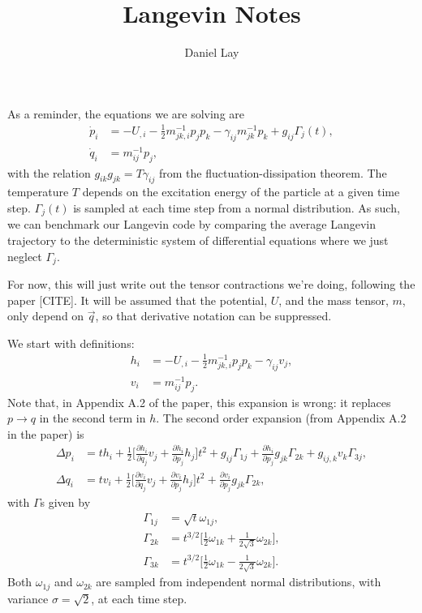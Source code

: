\documentclass[aps,mph,amsmath,amssymb,author-year]{revtex4-1}
\newcommand{\pd}{\partial}
\begin{document}
\title{Langevin Notes}
\author{Daniel Lay}

\maketitle

As a reminder, the equations we are solving are
\begin{align}
	\dot{p}_i&=-U_{,i}-\frac{1}{2}m^{-1}_{jk,i}p_jp_k-\gamma_{ij}m^{-1}_{jk}p_k+g_{ij}\Gamma_j(t),\\
	\dot{q}_i&=m^{-1}_{ij}p_j,
\end{align}
with the relation $g_{ik}g_{jk}=T\gamma_{ij}$ from the fluctuation-dissipation theorem. The temperature $T$ depends on the excitation energy of the particle at a given time step. $\Gamma_j(t)$ is sampled at each time step from a normal distribution. As such, we can benchmark our Langevin code by comparing the average Langevin trajectory to the deterministic system of differential equations where we just neglect $\Gamma_j$.

For now, this will just write out the tensor contractions we're doing, following the paper [CITE]. It will be assumed that the potential, $U$, and the mass tensor, $m$, only depend on $\vec{q}$, so that derivative notation can be suppressed.

We start with definitions:
\begin{align}
	h_i&=-U_{,i}-\frac{1}{2}m^{-1}_{jk,i}p_jp_k-\gamma_{ij}v_j,\\
	v_i&=m^{-1}_{ij}p_j.
\end{align}
Note that, in Appendix A.2 of the paper, this expansion is wrong: it replaces $p\to q$ in the second term in $h$. The second order expansion (from Appendix A.2 in the paper) is
\begin{align}
	\Delta p_i&=th_i+\frac{1}{2}\bigg[\frac{\pd h_i}{\pd q_j}v_j+\frac{\pd h_i}{\pd p_j}h_j\bigg]t^2+g_{ij}\Gamma_{1j}+\frac{\pd h_i}{\pd p_j}g_{jk}\Gamma_{2k}+g_{ij,k}v_k\Gamma_{3j},\\
	\Delta q_i&=tv_i+\frac{1}{2}\bigg[\frac{\pd v_i}{\pd q_j}v_j+\frac{\pd v_i}{\pd p_j}h_j\bigg]t^2+\frac{\pd v_i}{\pd p_j}g_{jk}\Gamma_{2k},
\end{align}
with $\Gamma$s given by
\begin{align}
	\Gamma_{1j}&=\sqrt{t}\omega_{1j},\\
	\Gamma_{2k}&=t^{3/2}\bigg[\frac{1}{2}\omega_{1k}+\frac{1}{2\sqrt{3}}\omega_{2k}\bigg],\\
	\Gamma_{3k}&=t^{3/2}\bigg[\frac{1}{2}\omega_{1k}-\frac{1}{2\sqrt{3}}\omega_{2k}\bigg].
\end{align}
Both $\omega_{1j}$ and $\omega_{2k}$ are sampled from independent normal distributions, with variance $\sigma=\sqrt{2}$, at each time step.
\end{document}
